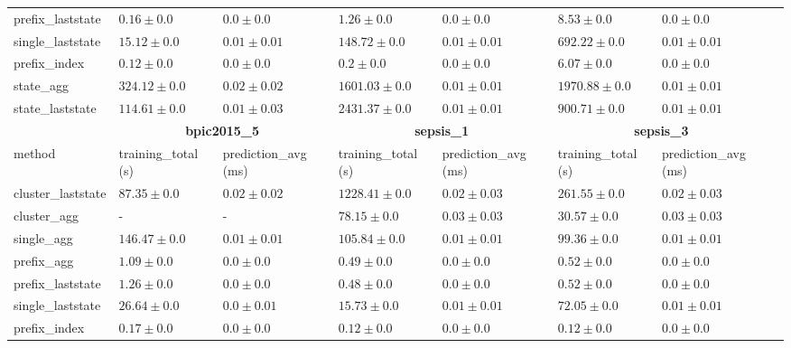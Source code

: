 \begin{table}[!htbp]
{\begin{tabular}{llllllll}
				 prefix\_laststate & $0.16 \pm 0.0$ & $\mathbf{0.0 \pm 0.0}$ & $1.26 \pm 0.0$ & $\mathbf{0.0 \pm 0.0}$ & $8.53 \pm 0.0$ & $\mathbf{0.0 \pm 0.0}$ \\ 
				 single\_laststate & $15.12 \pm 0.0$ & $0.01 \pm 0.01$ & $148.72 \pm 0.0$ & $0.01 \pm 0.01$ & $692.22 \pm 0.0$ & $0.01 \pm 0.01$ \\ 
				 prefix\_index & $\mathbf{0.12 \pm 0.0}$ & $\mathbf{0.0 \pm 0.0}$ & $\mathbf{0.2 \pm 0.0}$ & $\mathbf{0.0 \pm 0.0}$ & $\mathbf{6.07 \pm 0.0}$ & $\mathbf{0.0 \pm 0.0}$ \\ 
				 state\_agg & $324.12 \pm 0.0$ & $0.02 \pm 0.02$ & $1601.03 \pm 0.0$ & $0.01 \pm 0.01$ & $1970.88 \pm 0.0$ & $0.01 \pm 0.01$ \\ 
				 state\_laststate & $114.61 \pm 0.0$ & $0.01 \pm 0.03$ & $2431.37 \pm 0.0$ & $0.01 \pm 0.01$ & $900.71 \pm 0.0$ & $0.01 \pm 0.01$ \\ 
				 \bottomrule
				 \toprule
				 & \multicolumn{2}{c}{{\bfseries bpic2015\_5}} & \multicolumn{2}{c}{{\bfseries sepsis\_1}} & \multicolumn{2}{c}{{\bfseries sepsis\_3}} \\ \cmidrule(lr){2-3} \cmidrule(lr){4-5} \cmidrule(lr){6-7}
				 method  & training\_total (s) & prediction\_avg (ms) & training\_total (s) & prediction\_avg (ms) & training\_total (s) & prediction\_avg (ms) \\ \midrule
				 cluster\_laststate & $87.35 \pm 0.0$ & $0.02 \pm 0.02$ & $1228.41 \pm 0.0$ & $0.02 \pm 0.03$ & $261.55 \pm 0.0$ & $0.02 \pm 0.03$ \\ 
				 cluster\_agg & - & - & $78.15 \pm 0.0$ & $0.03 \pm 0.03$ & $30.57 \pm 0.0$ & $0.03 \pm 0.03$ \\ 
				 single\_agg & $146.47 \pm 0.0$ & $0.01 \pm 0.01$ & $105.84 \pm 0.0$ & $0.01 \pm 0.01$ & $99.36 \pm 0.0$ & $0.01 \pm 0.01$ \\ 
				 prefix\_agg & $1.09 \pm 0.0$ & $\mathbf{0.0 \pm 0.0}$ & $0.49 \pm 0.0$ & $\mathbf{0.0 \pm 0.0}$ & $0.52 \pm 0.0$ & $\mathbf{0.0 \pm 0.0}$ \\ 
				 prefix\_laststate & $1.26 \pm 0.0$ & $\mathbf{0.0 \pm 0.0}$ & $0.48 \pm 0.0$ & $\mathbf{0.0 \pm 0.0}$ & $0.52 \pm 0.0$ & $\mathbf{0.0 \pm 0.0}$ \\ 
				 single\_laststate & $26.64 \pm 0.0$ & $\mathbf{0.0 \pm 0.01}$ & $15.73 \pm 0.0$ & $0.01 \pm 0.01$ & $72.05 \pm 0.0$ & $0.01 \pm 0.01$ \\ 
				 prefix\_index & $\mathbf{0.17 \pm 0.0}$ & $\mathbf{0.0 \pm 0.0}$ & $\mathbf{0.12 \pm 0.0}$ & $\mathbf{0.0 \pm 0.0}$ & $\mathbf{0.12 \pm 0.0}$ & $\mathbf{0.0 \pm 0.0}$ \\ 

\end{tabular}}
\end{table}
